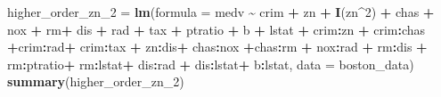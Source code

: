 \documentclass[
]{article}
\newenvironment{Shaded}{\begin{snugshade}}{\end{snugshade}}
\newcommand{\AttributeTok}[1]{\textcolor[rgb]{0.13,0.29,0.53}{#1}}
\newcommand{\DecValTok}[1]{\textcolor[rgb]{0.00,0.00,0.81}{#1}}
\newcommand{\FunctionTok}[1]{\textcolor[rgb]{0.13,0.29,0.53}{\textbf{#1}}}
\newcommand{\NormalTok}[1]{#1}
\newcommand{\OtherTok}[1]{\textcolor[rgb]{0.56,0.35,0.01}{#1}}
\newcommand{\SpecialCharTok}[1]{\textcolor[rgb]{0.81,0.36,0.00}{\textbf{#1}}}
\begin{document}
\begin{Shaded}
\begin{Highlighting}[]
\NormalTok{higher\_order\_zn\_2 }\OtherTok{=} \FunctionTok{lm}\NormalTok{(}\AttributeTok{formula =}\NormalTok{ medv }\SpecialCharTok{\textasciitilde{}}\NormalTok{ crim }\SpecialCharTok{+}\NormalTok{ zn }\SpecialCharTok{+} \FunctionTok{I}\NormalTok{(zn}\SpecialCharTok{\^{}}\DecValTok{2}\NormalTok{) }\SpecialCharTok{+}\NormalTok{ chas }\SpecialCharTok{+}\NormalTok{ nox }\SpecialCharTok{+}\NormalTok{ rm}\SpecialCharTok{+}\NormalTok{ dis }\SpecialCharTok{+}\NormalTok{ rad }\SpecialCharTok{+}\NormalTok{ tax }\SpecialCharTok{+}\NormalTok{ ptratio }\SpecialCharTok{+}\NormalTok{ b }\SpecialCharTok{+}\NormalTok{ lstat }\SpecialCharTok{+}\NormalTok{ crim}\SpecialCharTok{:}\NormalTok{zn }\SpecialCharTok{+}\NormalTok{ crim}\SpecialCharTok{:}\NormalTok{chas  }\SpecialCharTok{+}\NormalTok{crim}\SpecialCharTok{:}\NormalTok{rad}\SpecialCharTok{+}\NormalTok{ crim}\SpecialCharTok{:}\NormalTok{tax }\SpecialCharTok{+}\NormalTok{ zn}\SpecialCharTok{:}\NormalTok{dis}\SpecialCharTok{+}\NormalTok{ chas}\SpecialCharTok{:}\NormalTok{nox }\SpecialCharTok{+}\NormalTok{chas}\SpecialCharTok{:}\NormalTok{rm }\SpecialCharTok{+}\NormalTok{ nox}\SpecialCharTok{:}\NormalTok{rad }\SpecialCharTok{+}\NormalTok{ rm}\SpecialCharTok{:}\NormalTok{dis }\SpecialCharTok{+}\NormalTok{ rm}\SpecialCharTok{:}\NormalTok{ptratio}\SpecialCharTok{+}\NormalTok{ rm}\SpecialCharTok{:}\NormalTok{lstat}\SpecialCharTok{+}\NormalTok{ dis}\SpecialCharTok{:}\NormalTok{rad }\SpecialCharTok{+}\NormalTok{ dis}\SpecialCharTok{:}\NormalTok{lstat}\SpecialCharTok{+}\NormalTok{ b}\SpecialCharTok{:}\NormalTok{lstat, }\AttributeTok{data =}\NormalTok{ boston\_data)}
\FunctionTok{summary}\NormalTok{(higher\_order\_zn\_2)}
\end{Highlighting}
\end{Shaded}
\end{document}
